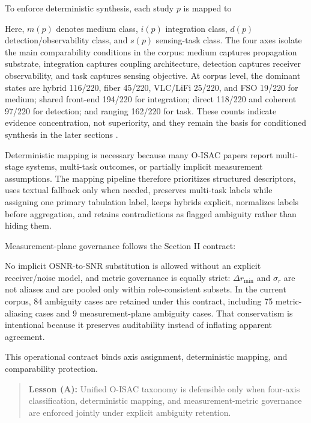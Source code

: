 \documentclass[letterpaper,journal]{IEEEtran}
\begin{document}
To enforce deterministic synthesis, each study $p$ is mapped to

Here, $m(p)$ denotes medium class, $i(p)$ integration class, $d(p)$ detection/observability class, and $s(p)$ sensing-task class. The four axes isolate the main comparability conditions in the corpus: medium captures propagation substrate, integration captures coupling architecture, detection captures receiver observability, and task captures sensing objective. At corpus level, the dominant states are hybrid 116/220, fiber 45/220, VLC/LiFi 25/220, and FSO 19/220 for medium; shared front-end 194/220 for integration; direct 118/220 and coherent 97/220 for detection; and ranging 162/220 for task. These counts indicate evidence concentration, not superiority, and they remain the basis for conditioned synthesis in the later sections .

Deterministic mapping is necessary because many O-ISAC papers report multi-stage systems, multi-task outcomes, or partially implicit measurement assumptions. The mapping pipeline therefore prioritizes structured descriptors, uses textual fallback only when needed, preserves multi-task labels while assigning one primary tabulation label, keeps hybrids explicit, normalizes labels before aggregation, and retains contradictions as flagged ambiguity rather than hiding them.

Measurement-plane governance follows the Section II contract:

No implicit OSNR-to-SNR substitution is allowed without an explicit receiver/noise model, and metric governance is equally strict: $\Delta r_{\min}$ and $\sigma_r$ are not aliases and are pooled only within role-consistent subsets. In the current corpus, 84 ambiguity cases are retained under this contract, including 75 metric-aliasing cases and 9 measurement-plane ambiguity cases. That conservatism is intentional because it preserves auditability instead of inflating apparent agreement.

This operational contract binds axis assignment, deterministic mapping, and comparability protection.

\begin{quote}
    \textbf{Lesson (A):} Unified O-ISAC taxonomy is defensible only when four-axis classification, deterministic mapping, and measurement-metric governance are enforced jointly under explicit ambiguity retention.
\end{quote}
\end{document}
